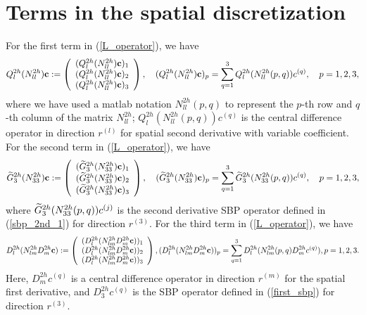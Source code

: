 \section{Terms in the spatial discretization}\label{appendix_cdomain}
For the first term in (\ref{L_operator}), we have
\begin{align*}%
{Q}_l^{2h}({N}_{ll}^{2h}){\bf c} := \left(\begin{array}{c}
({Q}_l^{2h}({N}_{ll}^{2h}){\bf c})_1 \\
({Q}_l^{2h}({N}_{ll}^{2h}){\bf c})_2 \\
({Q}_l^{2h}({N}_{ll}^{2h}){\bf c})_3 
\end{array}\right), \quad ({Q}_l^{2h}({N}_{ll}^{2h}){\bf c})_p = \sum_{q = 1}^{3} Q_l^{2h}(N_{ll}^{2h}(p,q)) {c}^{(q)},\quad p = 1,2,3,
\end{align*}
where we have used a matlab notation $N_{ll}^{2h}(p,q)$ to represent the $p$-th row and $q$-th column of the matrix $N_{ll}^{2h}$; $Q_l^{2h}(N_{ll}^{2h}(p,q)){ c}^{(q)}$ is the central difference operator in direction $r^{(l)}$ for spatial second derivative with variable coefficient. For the second term in (\ref{L_operator}), we have
\begin{align*}%
\wt{{G}}_3^{2h}({N}_{33}^{2h}){\bf c} := \left(\begin{array}{c}
(\wt{{G}}_3^{2h}({N}_{33}^{2h}){\bf c})_1 \\
(\wt{{G}}_3^{2h}({N}_{33}^{2h}){\bf c})_2 \\
(\wt{{G}}_3^{2h}({N}_{33}^{2h}){\bf c})_3 
\end{array}\right), \quad (\wt{{G}}_3^{2h}({N}_{33}^{2h}){\bf c})_p = \sum_{q = 1}^{3} \wt{G}_3^{2h}(N_{33}^{2h}(p,q)) {c}^{(q)},\quad p = 1,2,3,
\end{align*}
where $\widetilde{G}_3^{2h}(N_{33}^{2h}(p,q)) {c}^{(j)}$ is the second derivative SBP operator  defined in (\ref{sbp_2nd_1}) for direction $r^{(3)}$. For the third term in (\ref{L_operator}), we have
\begin{align*}%
{D}_l^{2h}({N}_{lm}^{2h}{D}_m^{2h}{\bf c}) := \left(\begin{array}{c}
(D^{2h}_l(N^{2h}_{lm}D_m^{2h}{\bf c}))_1 \\
(D^{2h}_l(N^{2h}_{lm}D_m^{2h}{\bf c}))_2 \\
(D^{2h}_l(N^{2h}_{lm}D_m^{2h}{\bf c}))_3 
\end{array}\right), (D^{2h}_l(N^{2h}_{lm}D_m^{2h}{\bf c}))_p = \sum_{q = 1}^{3} D^{2h}_l(N^{2h}_{lm}(p,q)D_m^{2h}{c}^{(q)}), p = 1,2,3.
\end{align*}
Here, $D_m^{2h}c^{(q)}$ is a central difference operator in direction $r^{(m)}$ for the spatial first derivative, and $D_3^{2h}c^{(q)}$ is the SBP operator defined in (\ref{first_sbp}) for direction $r^{(3)}$.

